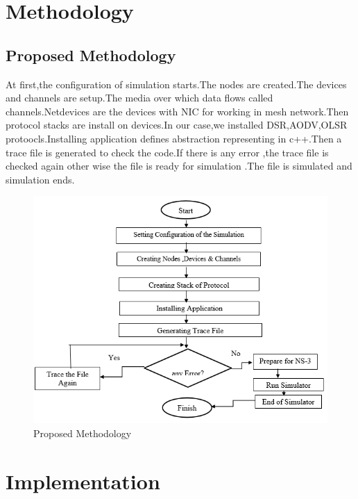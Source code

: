 \documentclass[12pt,a4paper]{report}
\begin{document}
\chapter{Methodology}

\section{Proposed Methodology}
At first,the configuration of simulation starts.The nodes are created.The devices and channels are setup.The media over which data flows called channels.Netdevices are the devices with NIC for working in mesh network.Then protocol stacks are install on devices.In our case,we installed DSR,AODV,OLSR protoocls.Installing application defines abstraction representing in c++.Then a trace file  is generated to check the code.If there is any error ,the trace file is checked again other wise the file is ready for simulation .The file is simulated and simulation ends.

\begin{figure}[hbtp]
\centering
\includegraphics[scale=.6]{method.png}
\caption{Proposed Methodology }
\end{figure}


\chapter{Implementation}
\end{document}
